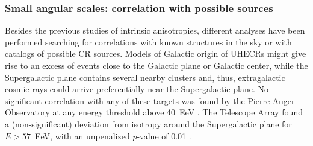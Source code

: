 \documentclass[twoside,12pt]{article}
\begin{document}
\subsubsection{Small angular scales: correlation with possible sources}

Besides the previous studies of intrinsic anisotropies, different analyses have been performed searching for correlations with known structures in the sky or with catalogs of possible CR sources.  Models of Galactic origin of UHECRs might give rise to an excess of events close to the Galactic plane or Galactic center, while the Supergalactic plane contains several nearby clusters and, thus, extragalactic cosmic rays could arrive preferentially near the Supergalactic plane. No significant correlation with any of these targets was found by the Pierre Auger Observatory at any energy threshold above 40~EeV \cite{SS15}. The Telescope Array found a (non-significant) deviation from isotropy around the Supergalactic plane for $E>57$~EeV, with an unpenalized $p$-value of 0.01 \cite{taicrc15}. 
\end{document}

